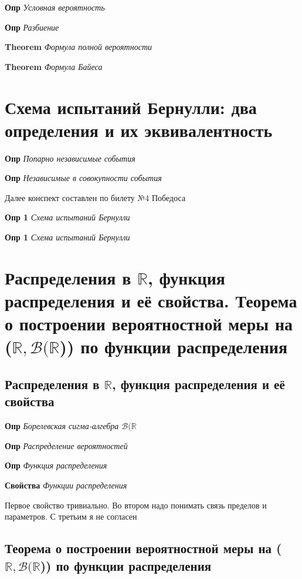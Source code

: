 \documentclass[a4paper, 14pt]{article}
\begin{document}
    \textbf{Опр} \textit{Условная вероятность}
    
    \textbf{Опр} \textit{Разбиение}
    
    \textbf{Theorem} \textit{Формула полной вероятности}
    
    \textbf{Theorem} \textit{Формула Байеса}
    
    \section{Схема испытаний Бернулли: два определения и их эквивалентность}
    
    \textbf{Опр} \textit{Попарно независимые события}
    
    \textbf{Опр} \textit{Независимые в совокупности события}
    
    Далее конспект составлен по билету №4 Победоса
    
    \textbf{Опр 1} \textit{Схема испытаний Бернулли}
    
    \textbf{Опр 1} \textit{Схема испытаний Бернулли}
    
    \section{Распределения в $\mathbb{R}$, функция распределения и её свойства.
    Теорема о построении вероятностной меры на ($\mathbb{R}, \mathcal{B}(\mathbb{R}$)) по функции распределения}
    
    \subsection{Распределения в $\mathbb{R}$, функция распределения и её свойства}
    
    \textbf{Опр} \textit{Борелевская сигма-алгебра $\mathcal{B}(\mathbb{R}$}
    
    \textbf{Опр} \textit{Распределение вероятностей}
    
    \textbf{Опр} \textit{Функция распределения}
    
    \textbf{Свойства} \textit{Функции распределения}
    
    Первое свойство тривиально.
    Во втором надо понимать связь пределов и параметров.
    С третьим я не согласен
    
    \subsection{Теорема о построении вероятностной меры на ($\mathbb{R}, \mathcal{B}(\mathbb{R}$)) по функции
    распределения}
    
\end{document}
